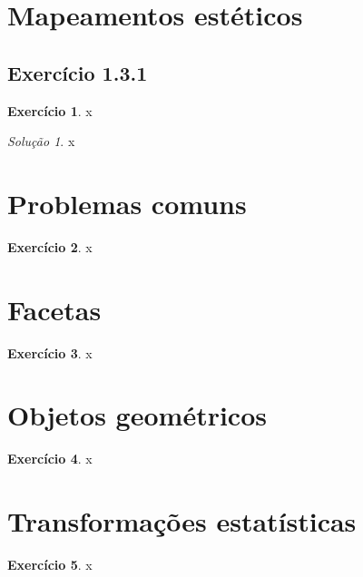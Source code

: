 \documentclass[
]{book}
\theoremstyle{definition}
\theoremstyle{definition}
\theoremstyle{definition}
\newtheorem{exercise}{Exercício}[chapter]
\theoremstyle{definition}
\theoremstyle{remark}
\newtheorem*{solution}{Solução}
\begin{document}
\hypertarget{mapeamentos-estuxe9ticos}{%
\section{Mapeamentos estéticos}\label{mapeamentos-estuxe9ticos}}

\hypertarget{exr1-3-1}{%
\subsection*{Exercício 1.3.1}\label{exr1-3-1}}

\begin{exercise}
x
\end{exercise}

\begin{solution}
x
\end{solution}

\hypertarget{problemas-comuns}{%
\section{Problemas comuns}\label{problemas-comuns}}

\begin{exercise}
x
\end{exercise}

\hypertarget{facetas}{%
\section{Facetas}\label{facetas}}

\begin{exercise}
x
\end{exercise}

\hypertarget{objetos-geomuxe9tricos}{%
\section{Objetos geométricos}\label{objetos-geomuxe9tricos}}

\begin{exercise}
x
\end{exercise}

\hypertarget{transformauxe7uxf5es-estatuxedsticas}{%
\section{Transformações estatísticas}\label{transformauxe7uxf5es-estatuxedsticas}}

\begin{exercise}
x
\end{exercise}
\end{document}
